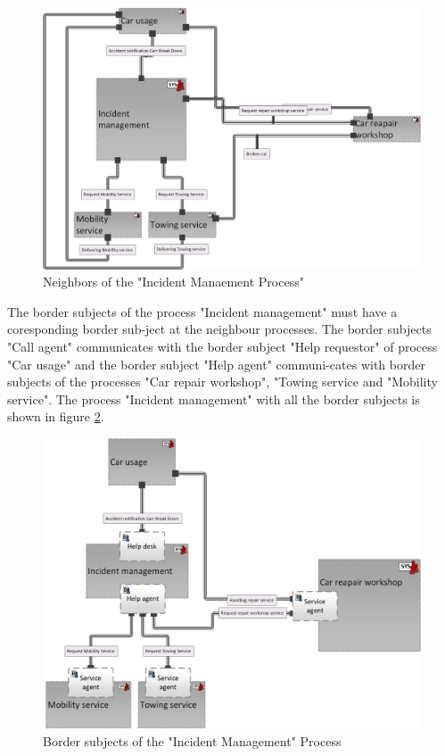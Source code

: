 \begin{figure}[ph]
	\centering
	\includegraphics[width=0.9\linewidth]{Figures/Chapter5/figures-hierarchy/Car-Service-Lev4}
	\caption[Neighbors of the "Incident Manaement Process"]{Neighbors of the "Incident Manaement Process"}
	\label{fig:car-service-lev4}
\end{figure}

The border subjects of the process "Incident management" must have a coresponding border sub-ject at the neighbour processes. The border subjects "Call agent" communicates with the border subject "Help requestor" of process "Car usage" and the border subject "Help agent" communi-cates with border subjects of the processes "Car repair workshop", "Towing service and "Mobility service". The process "Incident management" with all the border subjects is shown in  figure \ref{fig:car-service-lev5}.\\

\begin{figure}
	\centering
	\includegraphics[width=0.9\linewidth]{Figures/Chapter5/figures-hierarchy/Car-Service-Lev5}
	\caption[Border subjects of the "Incident Management" Process]{Border subjects of the "Incident Management" Process}
	\label{fig:car-service-lev5}
\end{figure}

